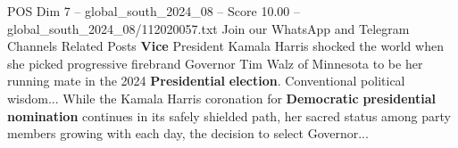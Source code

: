 \begin{textsample}{POS Dim 7 – global\_south\_2024\_08 – Score 10.00 – global\_south\_2024\_08/112020057.txt}
Join our WhatsApp and Telegram Channels Related Posts \textbf{Vice} President Kamala Harris shocked the world when she picked progressive firebrand Governor Tim Walz of Minnesota to be her running mate in the 2024 \textbf{Presidential} \textbf{election}.
Conventional political wisdom...
While the Kamala Harris coronation for \textbf{Democratic} \textbf{presidential} \textbf{nomination} continues in its safely shielded path, her sacred status among party members growing with each day, the decision to select Governor...

\end{textsample}
